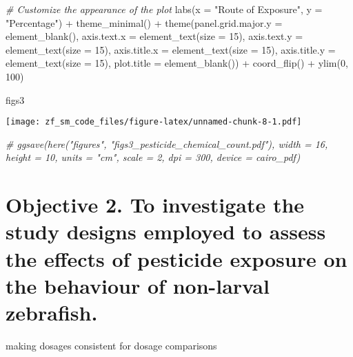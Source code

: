 \documentclass[
]{article}
\newenvironment{Shaded}{\begin{snugshade}}{\end{snugshade}}
\newcommand{\AttributeTok}[1]{\textcolor[rgb]{0.77,0.63,0.00}{#1}}
\newcommand{\CommentTok}[1]{\textcolor[rgb]{0.56,0.35,0.01}{\textit{#1}}}
\newcommand{\DecValTok}[1]{\textcolor[rgb]{0.00,0.00,0.81}{#1}}
\newcommand{\FunctionTok}[1]{\textcolor[rgb]{0.00,0.00,0.00}{#1}}
\newcommand{\NormalTok}[1]{#1}
\newcommand{\SpecialCharTok}[1]{\textcolor[rgb]{0.00,0.00,0.00}{#1}}
\newcommand{\StringTok}[1]{\textcolor[rgb]{0.31,0.60,0.02}{#1}}
\begin{document}
\begin{Shaded}
\begin{Highlighting}[]
  \CommentTok{\# Customize the appearance of the plot}
  \FunctionTok{labs}\NormalTok{(}\AttributeTok{x =} \StringTok{"Route of Exposure"}\NormalTok{, }\AttributeTok{y =} \StringTok{"Percentage"}\NormalTok{) }\SpecialCharTok{+}
  \FunctionTok{theme\_minimal}\NormalTok{() }\SpecialCharTok{+}
  \FunctionTok{theme}\NormalTok{(}\AttributeTok{panel.grid.major.y =} \FunctionTok{element\_blank}\NormalTok{(),}
        \AttributeTok{axis.text.x =} \FunctionTok{element\_text}\NormalTok{(}\AttributeTok{size =} \DecValTok{15}\NormalTok{),}
        \AttributeTok{axis.text.y =} \FunctionTok{element\_text}\NormalTok{(}\AttributeTok{size =} \DecValTok{15}\NormalTok{),}
        \AttributeTok{axis.title.x =} \FunctionTok{element\_text}\NormalTok{(}\AttributeTok{size =} \DecValTok{15}\NormalTok{),}
        \AttributeTok{axis.title.y =} \FunctionTok{element\_text}\NormalTok{(}\AttributeTok{size =} \DecValTok{15}\NormalTok{),}
        \AttributeTok{plot.title =} \FunctionTok{element\_blank}\NormalTok{()) }\SpecialCharTok{+}
        \FunctionTok{coord\_flip}\NormalTok{() }\SpecialCharTok{+} 
        \FunctionTok{ylim}\NormalTok{(}\DecValTok{0}\NormalTok{, }\DecValTok{100}\NormalTok{)}


\NormalTok{figs3}
\end{Highlighting}
\end{Shaded}

\texttt{[image: zf\_sm\_code\_files/figure-latex/unnamed-chunk-8-1.pdf]}

\begin{Shaded}
\begin{Highlighting}[]
\CommentTok{\# ggsave(here("figures", "figs3\_pesticide\_chemical\_count.pdf"), width = 16, height = 10, units = "cm", scale = 2, dpi = 300, device = cairo\_pdf)}
\end{Highlighting}
\end{Shaded}

\hypertarget{objective-2.-to-investigate-the-study-designs-employed-to-assess-the-effects-of-pesticide-exposure-on-the-behaviour-of-non-larval-zebrafish.}{%
\section{Objective 2. To investigate the study designs employed to
assess the effects of pesticide exposure on the behaviour of non-larval
zebrafish.}\label{objective-2.-to-investigate-the-study-designs-employed-to-assess-the-effects-of-pesticide-exposure-on-the-behaviour-of-non-larval-zebrafish.}}

making dosages consistent for dosage comparisons
\end{document}
